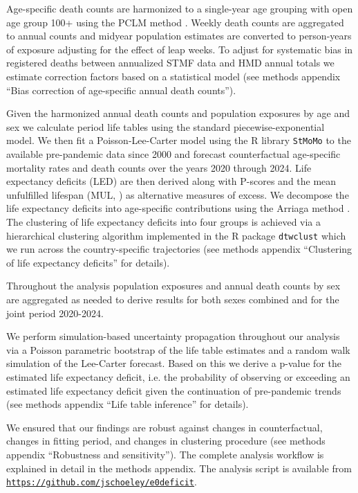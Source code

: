 \documentclass[12pt]{article}
\begin{document}
Age-specific death counts are harmonized to a single-year age grouping with open age group 100+ using the PCLM method \citep{Rizzi2015, Pascariu2018}. Weekly death counts are aggregated to annual counts and midyear population estimates are converted to person-years of exposure adjusting for the effect of leap weeks. To adjust for systematic bias in registered deaths between annualized STMF data and HMD annual totals we estimate correction factors based on a statistical model (see methods appendix ``Bias correction of age-specific annual death counts'').

Given the harmonized annual death counts and population exposures by age and sex we calculate period life tables using the standard piecewise-exponential model. We then fit a Poisson-Lee-Carter model \citep{Lee1992} using the R library \texttt{StMoMo} \citep{Villegas2015} to the available pre-pandemic data since 2000 and forecast counterfactual age-specific mortality rates and death counts over the years 2020 through 2024. Life expectancy deficits (LED) are then derived along with P-scores \citep{Ullrich-Kniffka2024} and the mean unfulfilled lifespan (MUL, \cite{Heuveline2021}) as alternative measures of excess. We decompose the life expectancy deficits into age-specific contributions using the Arriaga method \citep{Arriaga1984}. The clustering of life expectancy deficits into four groups is achieved via a hierarchical clustering algorithm implemented in the R package \texttt{dtwclust} \citep{AlexisSarda-Espinosa2024} which we run across the country-specific trajectories (see methods appendix ``Clustering of life expectancy deficits'' for details).

Throughout the analysis population exposures and annual death counts by sex are aggregated as needed to derive results for both sexes combined and for the joint period 2020-2024.

We perform simulation-based uncertainty propagation throughout our analysis via a Poisson parametric bootstrap of the life table estimates and a random walk simulation of the Lee-Carter forecast. Based on this we derive a p-value for the estimated life expectancy deficit, i.e. the probability of observing or exceeding an estimated life expectancy deficit given the continuation of pre-pandemic trends (see methods appendix ``Life table inference'' for details).

We ensured that our findings are robust against changes in counterfactual, changes in fitting period, and changes in clustering procedure (see methods appendix ``Robustness and sensitivity''). The complete analysis workflow is explained in detail in the methods appendix. The analysis script is available from \href{https://github.com/jschoeley/e0deficit}{\texttt{https://github.com/jschoeley/e0deficit}}.
\end{document}

